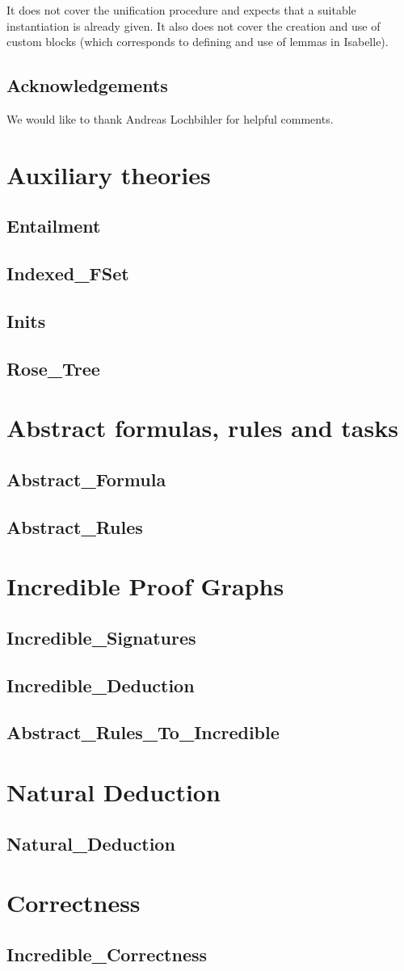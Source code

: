 \documentclass[11pt,a4paper,parskip=half]{scrartcl}
\begin{document}
It does not cover the unification procedure and expects that a suitable instantiation is already
given. It also does not cover the creation and use of custom blocks (which corresponds to defining 
and use of lemmas in Isabelle).


\subsection*{Acknowledgements}

We would like to thank Andreas Lochbihler for helpful comments.




\clearpage
\newcommand{\theory}[1]{\subsection{#1}\label{sec\string_#1}}

\section{Auxiliary theories}
\label{ch\string_aux}

\theory{Entailment}
\theory{Indexed\string_FSet}
\theory{Inits}
\theory{Rose\string_Tree}

\clearpage
\section{Abstract formulas, rules and tasks}
\theory{Abstract\string_Formula}
\theory{Abstract\string_Rules}

\clearpage
\section{Incredible Proof Graphs}
\theory{Incredible\string_Signatures}
\theory{Incredible\string_Deduction}
\theory{Abstract\string_Rules\string_To\string_Incredible}

\clearpage
\section{Natural Deduction}
\theory{Natural\string_Deduction}

\clearpage
\section{Correctness}
\theory{Incredible\string_Correctness}
\end{document}
